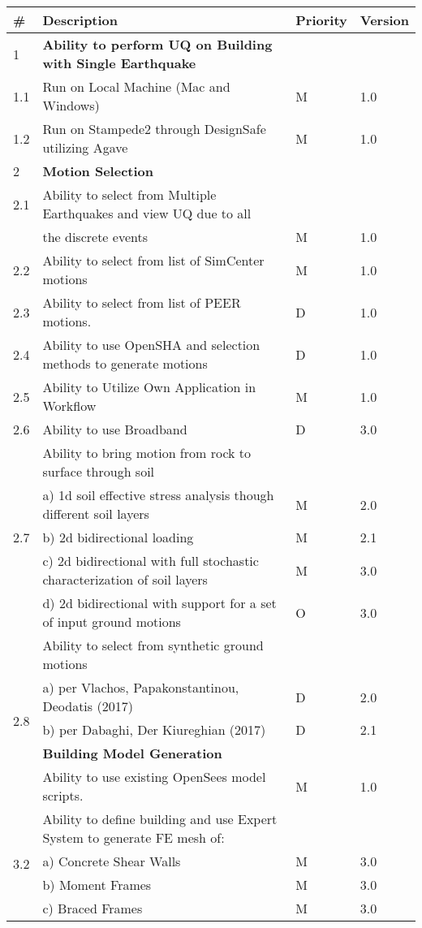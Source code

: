 \begin{table}[hbt!]                 
  \centering
\begin{adjustbox}{max width=\textwidth}            
  \begin{tabular}{llll}                    
    \toprule          
      \# & Description & Priority & Version \\ \hline
      1 & \textbf{Ability to perform UQ on Building with Single Earthquake} &  &  \\ 
	1.1 & Run on Local Machine (Mac and Windows) & M & 1.0 \\ \hline
	1.2 & Run on Stampede2 through DesignSafe utilizing Agave & M & 1.0 \\ \hline
	2 & \textbf{Motion Selection} &  &  \\ \hline
	2.1 & Ability to select from Multiple Earthquakes and view UQ due to all &&\\
	    & the discrete events & M & 1.0  \\ \hline
	2.2 & Ability to select from list of SimCenter motions & M & 1.0 \\ \hline
	2.3 & Ability to select from list of PEER motions. & D & 1.0 \\ \hline
	2.4 & Ability to use OpenSHA and selection methods to generate motions & D & 1.0 \\ \hline
	2.5 & Ability to Utilize Own Application in Workflow & M & 1.0 \\ \hline
	2.6 & Ability to use Broadband & D & 3.0 \\ \hline
	\multirow{5}{*}{2.7} 
	& Ability to bring motion from rock to surface through soil &  &  \\ 
	 & a)     1d soil effective stress analysis though different soil layers & M & 2.0  \\ 
	 & b)     2d bidirectional loading & M & 2.1 \\ 
	 & c)     2d bidirectional with full stochastic characterization of soil layers & M & 3.0 \\
	 & d)     2d bidirectional with support for a set of input ground motions & O & 3.0 \\ 
	 \hline
	\multirow{5}{*}{2.8} 
	& Ability to select from synthetic ground motions &  &  \\
	 & a)     per Vlachos, Papakonstantinou, Deodatis (2017) & D & 2.0  \\ 
	 & b)     per Dabaghi, Der Kiureghian (2017) & D & 2.1 \\ \hline
	3 & \textbf{Building Model Generation} &  &  \\ \hline
	3.1 & Ability to use existing OpenSees model scripts. & M & 1.0 \\ \hline
	\multirow{5}{*}{3.2}  & Ability to define building and use Expert System to generate FE mesh of: &  &  \\
	 & a)     Concrete Shear Walls & M & 3.0 \\ 
	 & b)     Moment Frames & M & 3.0 \\ 
	 & c)     Braced Frames & M & 3.0  \\ \hline
	 

\end{tabular}
\end{adjustbox}
\end{table}
